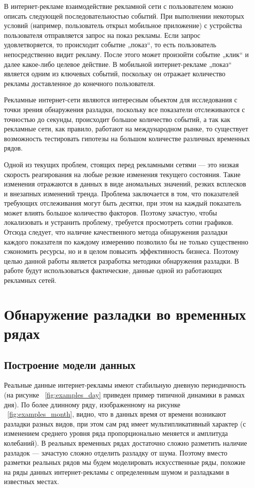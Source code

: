 \documentclass[%
12pt,
master,  %
natbib,      %
subf,        %
substylefile = spbu.rtx,
href,        %
colorlinks,  %
]{disser}
\begin{document}
В интернет-рекламе взаимодействие рекламной сети с пользователем можно описать следующей последовательностью событий. При выполнении некоторых условий (например, пользователь открыл мобильное приложение) с устройства пользователя отправляется запрос на показ рекламы. Если запрос удовлетворяется, то происходит событие „показ“, то есть пользователь непосредственно видит рекламу. После этого может произойти событие „клик“ и далее какое-либо целевое действие. В мобильной интернет-рекламе „показ“ является одним из ключевых событий, поскольку он отражает количество рекламы доставленное до конечного пользователя.

Рекламные интернет-сети являются интересным объектом для исследования с точки зрения обнаружения разладки, поскольку все показатели отслеживаются с точностью до секунды, происходит большое количество событий, а так как рекламные сети, как правило, работают на международном рынке, то существует возможность тестировать гипотезы на большом количестве различных временных рядов.

Одной из текущих проблем, стоящих перед рекламными сетями --- это низкая скорость реагирования на любые резкие изменения текущего состояния. Такие изменения отражаются в данных в виде аномальных значений, резких всплесков и внезапных изменений тренда. Проблема заключается в том, что показателей требующих отслеживания могут быть десятки, при этом на каждый показатель может влиять большое количество факторов. Поэтому зачастую, чтобы локализовать и устранить проблему, требуется просмотреть сотни графиков. Отсюда следует, что наличие качественного метода обнаружения разладки каждого показателя по каждому измерению позволило бы не только существенно сэкономить ресурсы, но и в целом повысить эффективность бизнеса. Поэтому целью данной работы является разработка методики обнаружения разладки. В работе будут использоваться фактические, данные одной из работающих рекламных сетей.



\chapter{Обнаружение разладки во временных рядах}

\section{Построение модели данных}\label{section:data_modeling}

Реальные данные интернет-рекламы имеют стабильную дневную периодичность (на рисунке ~\ref{fig:examples_day} приведен пример типичной динамики в рамках дня). По более длинному ряду, изображенному на рисунке ~\ref{fig:examples_month}, видно, что в данных время от времени возникают разладки разных видов, при этом сам ряд имеет мультипликативный характер (с изменением среднего уровня ряда пропорционально меняется и амплитуда колебаний). В реальных временных рядах достаточно сложно разметить наличие разладок --- зачастую сложно отделить разладку от шума. Поэтому вместо разметки реальных рядов мы будем моделировать искусственные ряды, похожие на ряды данных интернет-рекламы с определенным шумом и разладками в известных местах.
\end{document}
